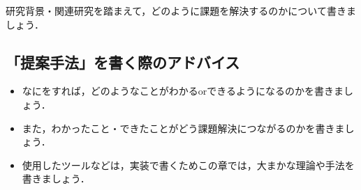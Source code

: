 研究背景・関連研究を踏まえて，どのように課題を解決するのかについて書きましょう．

\subsection*{「提案手法」を書く際のアドバイス}
\begin{itemize}
    \item なにをすれば，どのようなことがわかるorできるようになるのかを書きましょう．
    \item また，わかったこと・できたことがどう課題解決につながるのかを書きましょう．
    \item 使用したツールなどは，実装で書くためこの章では，大まかな理論や手法を書きましょう．
\end{itemize}